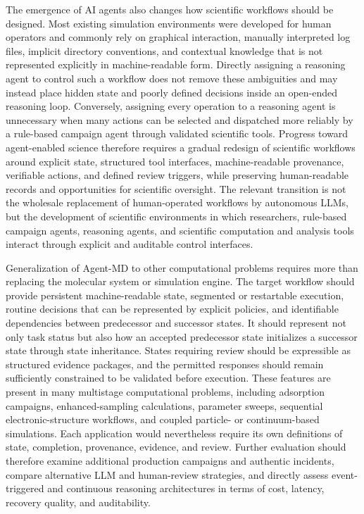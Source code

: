 The emergence of AI agents also changes how scientific workflows should be designed. Most existing simulation environments were developed for human operators and commonly rely on graphical interaction, manually interpreted log files, implicit directory conventions, and contextual knowledge that is not represented explicitly in machine-readable form. Directly assigning a reasoning agent to control such a workflow does not remove these ambiguities and may instead place hidden state and poorly defined decisions inside an open-ended reasoning loop. Conversely, assigning every operation to a reasoning agent is unnecessary when many actions can be selected and dispatched more reliably by a rule-based campaign agent through validated scientific tools. Progress toward agent-enabled science therefore requires a gradual redesign of scientific workflows around explicit state, structured tool interfaces, machine-readable provenance, verifiable actions, and defined review triggers, while preserving human-readable records and opportunities for scientific oversight. The relevant transition is not the wholesale replacement of human-operated workflows by autonomous LLMs, but the development of scientific environments in which researchers, rule-based campaign agents, reasoning agents, and scientific computation and analysis tools interact through explicit and auditable control interfaces.

Generalization of Agent-MD to other computational problems requires more than replacing the molecular system or simulation engine. The target workflow should provide persistent machine-readable state, segmented or restartable execution, routine decisions that can be represented by explicit policies, and identifiable dependencies between predecessor and successor states. It should represent not only task status but also how an accepted predecessor state initializes a successor state through state inheritance. States requiring review should be expressible as structured evidence packages, and the permitted responses should remain sufficiently constrained to be validated before execution. These features are present in many multistage computational problems, including adsorption campaigns, enhanced-sampling calculations, parameter sweeps, sequential electronic-structure workflows, and coupled particle- or continuum-based simulations. Each application would nevertheless require its own definitions of state, completion, provenance, evidence, and review. Further evaluation should therefore examine additional production campaigns and authentic incidents, compare alternative LLM and human-review strategies, and directly assess event-triggered and continuous reasoning architectures in terms of cost, latency, recovery quality, and auditability.
